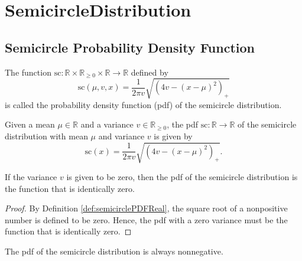 \chapter{SemicircleDistribution}

\section{Semicircle Probability Density Function}



\begin{definition}\label{def:semicirclePDFReal}
  \leanok
    The function $\mathrm{sc} : \mathbb{R} \times \mathbb{R}_{\geq 0} \times \mathbb{R} \rightarrow \mathbb{R}$ defined by
   \[
    \mathrm{sc}(\mu,v,x)
    = \frac{1}{2πv} \sqrt{(4v - (x - μ)^2)_+}
   \]
   is called the probability density function (pdf) of the semicircle distribution.
\end{definition}
\begin{lemma}\label{lem:semicirclePDFReal_def}
  \leanok
    Given a mean $\mu \in \mathbb{R}$ and a variance $v \in \mathbb{R}_{\geq 0}$, the pdf $\mathrm{sc} : \mathbb{R} \rightarrow \mathbb{R}$
    of the semicircle distribution with mean $\mu$ and variance $v$ is given by
  \[
    \mathrm{sc}(x) =
    \frac{1}{2πv} \sqrt{(4v - (x - μ)^2)_+}.
  \]
\end{lemma}
\begin{lemma}\label{lem:semicirclePDFReal_zero_var}
    \leanok
    If the variance $v$ is given to be zero, then the pdf of the semicircle distribution is the function that is identically zero.
\end{lemma}
\begin{proof}
    By Definition \ref{def:semicirclePDFReal}, the square root of a nonpositive number is defined to be zero.
    Hence, the pdf with a zero variance must be the function that is identically zero.
\end{proof}
\begin{lemma}\label{lem:semicirclePDFReal_nonneg}
    \leanok
    The pdf of the semicircle distribution is always nonnegative.
\end{lemma}
